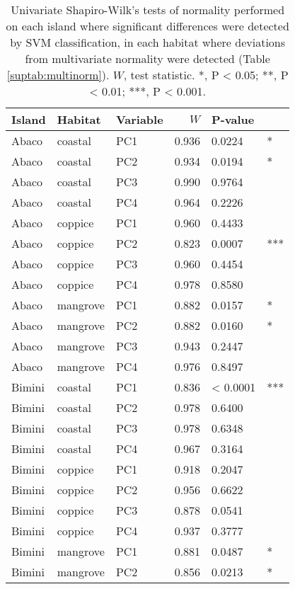 \begin{table}[H]
    \caption{Univariate Shapiro-Wilk's tests of normality performed on each island where significant differences were detected by SVM classification, in each habitat where deviations from multivariate normality were detected (Table \ref{suptab:multinorm}). $W$, test statistic. *, P < 0.05; **, P < 0.01; ***, P < 0.001.}
    \centering
    \begin{tabular}{lllrll}
        \hline
        Island & Habitat & Variable & $W$ & P-value & \\
        \hline
        Abaco & coastal & PC1 & 0.936 & 0.0224 & *\\
        Abaco & coastal & PC2 & 0.934 & 0.0194 & *\\
        Abaco & coastal & PC3 & 0.990 & 0.9764 & \\
        Abaco & coastal & PC4 & 0.964 & 0.2226 & \\
        Abaco & coppice & PC1 & 0.960 & 0.4433 & \\
        Abaco & coppice & PC2 & 0.823 & 0.0007 & ***\\
        Abaco & coppice & PC3 & 0.960 & 0.4454 & \\
        Abaco & coppice & PC4 & 0.978 & 0.8580 & \\
        Abaco & mangrove & PC1 & 0.882 & 0.0157 & *\\
        Abaco & mangrove & PC2 & 0.882 & 0.0160 & *\\
        Abaco & mangrove & PC3 & 0.943 & 0.2447 & \\
        Abaco & mangrove & PC4 & 0.976 & 0.8497 & \\
        Bimini & coastal & PC1 & 0.836 & < 0.0001 & ***\\
        Bimini & coastal & PC2 & 0.978 & 0.6400 & \\
        Bimini & coastal & PC3 & 0.978 & 0.6348 & \\
        Bimini & coastal & PC4 & 0.967 & 0.3164 & \\
        Bimini & coppice & PC1 & 0.918 & 0.2047 & \\
        Bimini & coppice & PC2 & 0.956 & 0.6622 & \\
        Bimini & coppice & PC3 & 0.878 & 0.0541 & \\
        Bimini & coppice & PC4 & 0.937 & 0.3777 & \\
        Bimini & mangrove & PC1 & 0.881 & 0.0487 & *\\
        Bimini & mangrove & PC2 & 0.856 & 0.0213 & *\\

\end{tabular}
\end{table}
